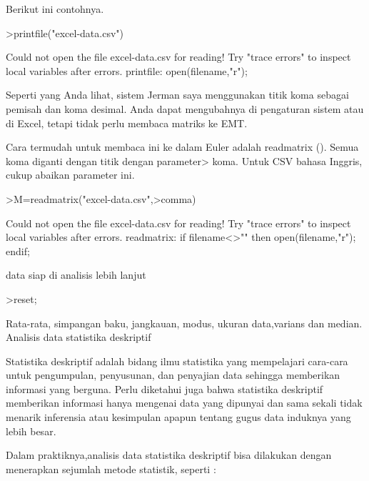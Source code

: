 \documentclass[a4paper,10pt]{article}
\begin{document}
\begin{eulernotebook}
\begin{eulercomment}
\begin{eulercomment}
\begin{eulercomment}
\begin{eulercomment}
\begin{eulercomment}
\begin{eulercomment}
\begin{eulercomment}
\begin{eulercomment}
\begin{eulercomment}
\begin{eulercomment}
\begin{eulercomment}
Berikut ini contohnya.
\end{eulercomment}
\begin{eulerprompt}
>printfile("excel-data.csv")
\end{eulerprompt}
\begin{euleroutput}
  Could not open the file
  excel-data.csv
  for reading!
  Try "trace errors" to inspect local variables after errors.
  printfile:
      open(filename,"r");
\end{euleroutput}
\begin{eulercomment}
Seperti yang Anda lihat, sistem Jerman saya menggunakan titik koma
sebagai pemisah dan koma desimal. Anda dapat mengubahnya di pengaturan
sistem atau di Excel, tetapi tidak perlu membaca matriks ke EMT.

Cara termudah untuk membaca ini ke dalam Euler adalah readmatrix ().
Semua koma diganti dengan titik dengan parameter\textgreater{} koma. Untuk CSV
bahasa Inggris, cukup abaikan parameter ini.
\end{eulercomment}
\begin{eulerprompt}
>M=readmatrix("excel-data.csv",>comma)
\end{eulerprompt}
\begin{euleroutput}
  Could not open the file
  excel-data.csv
  for reading!
  Try "trace errors" to inspect local variables after errors.
  readmatrix:
      if filename<>"" then open(filename,"r"); endif;
\end{euleroutput}
\begin{eulercomment}
data siap di analisis lebih lanjut
\end{eulercomment}
\begin{eulerprompt}
>reset;
\end{eulerprompt}
\begin{eulercomment}
Rata-rata, simpangan baku, jangkauan, modus, ukuran data,varians dan
median.\\
Analisis data statistika deskriptif

Statistika deskriptif adalah bidang ilmu statistika yang mempelajari
cara-cara untuk pengumpulan, penyusunan, dan penyajian data sehingga
memberikan informasi yang berguna. Perlu diketahui juga bahwa
statistika deskriptif memberikan informasi hanya mengenai data yang
dipunyai dan sama sekali tidak menarik inferensia atau kesimpulan
apapun tentang gugus data induknya yang lebih besar.

Dalam praktiknya,analisis data statistika deskriptif bisa dilakukan
dengan menerapkan sejumlah metode statistik, seperti :


\end{eulercomment}
\end{eulercomment}
\end{eulercomment}
\end{eulercomment}
\end{eulercomment}
\end{eulercomment}
\end{eulercomment}
\end{eulercomment}
\end{eulercomment}
\end{eulercomment}
\end{eulercomment}
\end{eulernotebook}
\end{document}
